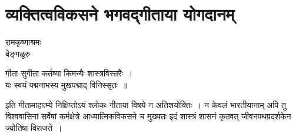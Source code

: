 {\fontsize{15}{17}\selectfont
\presetvalues
\chapter{व्यक्तित्वविकसने भगवद्गीताया योगदानम्}

\begin{center}
\smallskip
रामकृष्णाश्रमः\\
बेङ्गळूरु
\addrule
\end{center}

\begin{center}
गीता सुगीता कर्तव्या किमन्यैः शास्त्रविस्तरैः~। \\
यः स्वयं पद्मनाभस्य मुखपद्माद् विनिस्सृतः~॥
\end{center}
इति गीतामाहात्म्ये निक्षिप्तोऽयं श्लोकः गीताया विषये न अतिशयोक्तिः~। न केवलं भारतीयानाम् अपि तु विश्ववासिनां सर्वेषां कर्मक्षेत्रे आध्यात्मिकविकसने च मुख्यतः इदं शास्त्रं शासनं कृतवत् जीवनपथप्रदर्शकेन ज्योतिषा विराजते~। 

}
